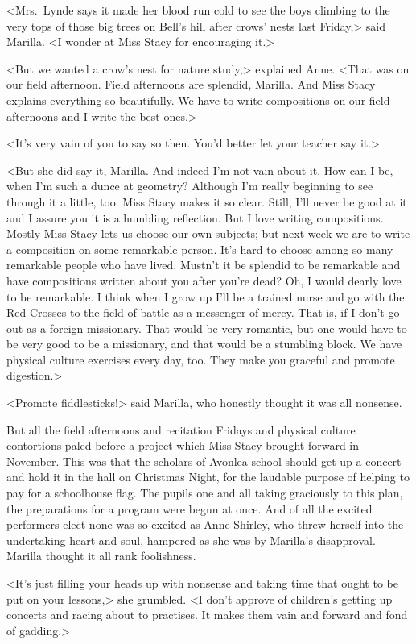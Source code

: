 <Mrs.~Lynde says it made her blood run cold to see the boys climbing to the very tops of those big trees on Bell's hill after crows' nests last Friday,> said Marilla. <I wonder at Miss Stacy for encouraging it.>

<But we wanted a crow's nest for nature study,> explained Anne. <That was on our field afternoon. Field afternoons are splendid, Marilla. And Miss Stacy explains everything so beautifully. We have to write compositions on our field afternoons and I write the best ones.>

<It's very vain of you to say so then. You'd better let your teacher say it.>

<But she did say it, Marilla. And indeed I'm not vain about it. How can I be, when I'm such a dunce at geometry? Although I'm really beginning to see through it a little, too. Miss Stacy makes it so clear. Still, I'll never be good at it and I assure you it is a humbling reflection. But I love writing compositions. Mostly Miss Stacy lets us choose our own subjects; but next week we are to write a composition on some remarkable person. It's hard to choose among so many remarkable people who have lived. Mustn't it be splendid to be remarkable and have compositions written about you after you're dead? Oh, I would dearly love to be remarkable. I think when I grow up I'll be a trained nurse and go with the Red Crosses to the field of battle as a messenger of mercy. That is, if I don't go out as a foreign missionary. That would be very romantic, but one would have to be very good to be a missionary, and that would be a stumbling block. We have physical culture exercises every day, too. They make you graceful and promote digestion.>

<Promote fiddlesticks!> said Marilla, who honestly thought it was all nonsense.

But all the field afternoons and recitation Fridays and physical culture contortions paled before a project which Miss Stacy brought forward in November. This was that the scholars of Avonlea school should get up a concert and hold it in the hall on Christmas Night, for the laudable purpose of helping to pay for a schoolhouse flag. The pupils one and all taking graciously to this plan, the preparations for a program were begun at once. And of all the excited performers-elect none was so excited as Anne Shirley, who threw herself into the undertaking heart and soul, hampered as she was by Marilla's disapproval. Marilla thought it all rank foolishness.

<It's just filling your heads up with nonsense and taking time that ought to be put on your lessons,> she grumbled. <I don't approve of children's getting up concerts and racing about to practises. It makes them vain and forward and fond of gadding.>

